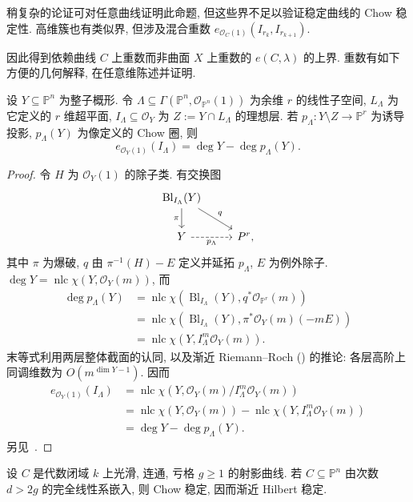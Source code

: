 \begin{remark}\label{src:6.8.20}
稍复杂的论证可对任意曲线证明此命题, 但这些界不足以验证稳定曲线的 Chow 稳定性. 高维簇也有类似界, 但涉及混合重数 $e_{\mathcal O_C(1)}(I_{r_k},\allowbreak I_{r_{k+1}})$.
\end{remark}
因此得到依赖曲线 $C$ 上重数而非曲面 $X$ 上重数的 $e(C,\allowbreak \lambda)$ 的上界. 重数有如下方便的几何解释, 在任意维陈述并证明.
\begin{proposition}\label{src:6.8.21}
设 $Y\subseteq\mathbb P^n$ 为整子概形. 令 $\Lambda\subseteq\Gamma(\mathbb P^n,\allowbreak \mathcal O_{\mathbb P^n}(1))$ 为余维 $r$ 的线性子空间, $L_\Lambda$ 为它定义的 $r$ 维超平面, $I_\Lambda\subseteq\mathcal O_Y$ 为 $Z:=Y\cap L_\Lambda$ 的理想层. 若 $p_\Lambda:Y\setminus Z\to\mathbb P^r$ 为诱导投影, $p_\Lambda(Y)$ 为像定义的 Chow 圈, 则
\[
e_{\mathcal O_Y(1)}(I_\Lambda)=\deg Y-\deg p_\Lambda(Y).
\]
\end{proposition}
\begin{proof}
令 $H$ 为 $\mathcal O_Y(1)$ 的除子类. 有交换图
\[
\begin{tikzcd}
\operatorname{Bl}_{I_\Lambda}(Y)\arrow[d,"\pi"']\arrow[dr,"q"]&\\
Y\arrow[r,dashed,"p_\Lambda"']&\mathbb P^r,
\end{tikzcd}
\]
其中 $\pi$ 为爆破, $q$ 由 $\pi^{-1}(H)-E$ 定义并延拓 $p_\Lambda$, $E$ 为例外除子. $\deg Y=\operatorname{nlc}\chi(Y,\allowbreak \mathcal O_Y(m))$, 而
\[
\begin{aligned}
\deg p_\Lambda(Y)&=\operatorname{nlc}\chi(\operatorname{Bl}_{I_\Lambda}(Y),q^*\mathcal O_{\mathbb P^r}(m))\\
&=\operatorname{nlc}\chi(\operatorname{Bl}_{I_\Lambda}(Y),\pi^*\mathcal O_Y(m)(-mE))\\
&=\operatorname{nlc}\chi(Y,I_\Lambda^m\mathcal O_Y(m)).
\end{aligned}
\]
末等式利用两层整体截面的认同, 以及渐近 Riemann--Roch () 的推论: 各层高阶上同调维数为 $O(m^{\dim Y-1})$. 因而
\[
\begin{aligned}
e_{\mathcal O_Y(1)}(I_\Lambda)
&=\operatorname{nlc}\chi(Y,\mathcal O_Y(m)/I_\Lambda^m\mathcal O_Y(m))\\
&=\operatorname{nlc}\chi(Y,\mathcal O_Y(m))-\operatorname{nlc}\chi(Y,I_\Lambda^m\mathcal O_Y(m))\\
&=\deg Y-\deg p_\Lambda(Y).
\end{aligned}
\]
另见~\cite[命题 2.5]{Mum77}.
\end{proof}
\newpage
\begin{theorem}\label{src:6.8.22}
设 $C$ 是代数闭域 $k$ 上光滑, 连通, 亏格 $g\geq1$ 的射影曲线. 若 $C\subseteq\mathbb P^n$ 由次数 $d>2g$ 的完全线性系嵌入, 则 Chow 稳定, 因而渐近 Hilbert 稳定.
\end{theorem}
